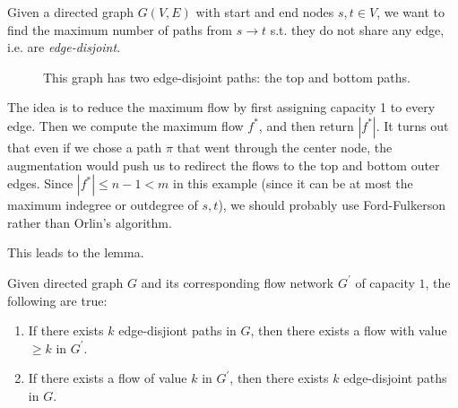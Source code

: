 \documentclass{article}
\begin{document}
    \begin{example}
      Given a directed graph $G(V, E)$ with start and end nodes $s, t \in V$, we want to find the maximum number of paths from $s \rightarrow t$ s.t. they do not share any edge, i.e. are \textit{edge-disjoint}. 
      \begin{figure}[H]
        \centering 
        \caption{This graph has two edge-disjoint paths: the top and bottom paths. } 
        \label{fig:edge_disjoint}
      \end{figure}
      
      The idea is to reduce the maximum flow by first assigning capacity 1 to every edge. Then we compute the maximum flow $f^\ast$, and then return $|f^\ast|$. It turns out that even if we chose a path $\pi$ that went through the center node, the augmentation would push us to redirect the flows to the top and bottom outer edges. Since $|f^\ast| \leq n-1 < m$ in this example (since it can be at most the maximum indegree or outdegree of $s, t$), we should probably use Ford-Fulkerson rather than Orlin's algorithm. 
    \end{example}

    This leads to the lemma. 

    \begin{theorem}
      Given directed graph $G$ and its corresponding flow network $G^\prime$ of capacity $1$, the following are true: 
      \begin{enumerate}
        \item If there exists $k$ edge-disjiont paths in $G$, then there exists a flow with value $\geq k$ in $G^\prime$. 
        \item If there exists a flow of value $k$ in $G^\prime$, then there exists $k$ edge-disjoint paths in $G$. 
      \end{enumerate}
    \end{theorem}
\end{document}
